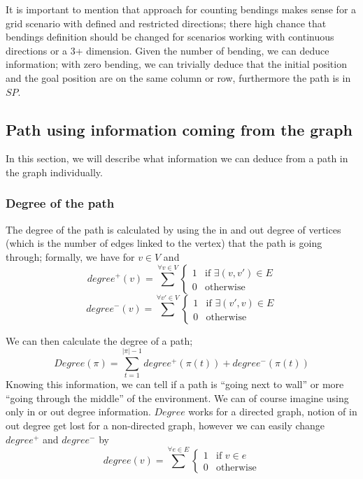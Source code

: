 It is important to mention that approach for counting bendings makes sense for a grid scenario with defined and restricted directions; there high chance that bendings definition should be changed for scenarios working with continuous directions or a 3+ dimension. 
Given the number of bending, we can deduce information; with zero bending, we can trivially deduce that the initial position and the goal position are on the same column or row, furthermore the path is in \(SP\).




\subsection{Path using information coming from the graph}
In this section, we will describe what information we can deduce from a path in the graph individually. 
\subsubsection{Degree of the path}
The degree of the path is calculated by using the in and out degree of vertices (which is the number of edges linked to the vertex) that the path is going through; formally, we have for \(v\in V\) and \[
  degree^+(v) = \sum^{\forall v\in V}{ 
    \begin{cases}
    1 & \text{if } \exists (v,v') \in E \\
    0 & \text{otherwise}  
    \end{cases}}
\] 
\[
  degree^-(v) = \sum^{\forall v'\in V}{  
    \begin{cases}
    1 & \text{if } \exists (v',v) \in E \\
    0 & \text{otherwise}  
    \end{cases}}
\] 



We can then calculate the degree of a path; \[
  Degree(\pi) = \sum_{t=1}^{|\pi|-1} degree^+(\pi(t)) + degree^-(\pi(t))
  \] Knowing this information, we can tell if a path is ``going next to wall'' or more ``going through the middle'' of the environment. We can of course imagine using only in or out degree information. \(Degree\) works for a directed graph, notion of in out degree get lost for a non-directed graph, however we can easily change \(degree^+\) and \(degree^-\) by  \[
    degree(v) = \sum^{\forall e\in E}{ 
      \begin{cases}
      1 & \text{if } v\in e \\
      0 & \text{otherwise}  
      \end{cases}}
  \]

